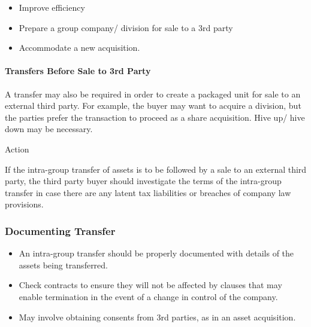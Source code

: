 \documentclass[
]{article}
\providecommand{\tightlist}{%
  \setlength{\itemsep}{0pt}\setlength{\parskip}{0pt}}
\newenvironment{env-0fd99421-2bbe-4c93-bdcb-b11371f3d791}
{
    \savenotes\tcolorbox[blanker,breakable,left=5pt,borderline west={2pt}{-4pt}{aquamarine}]
}
{
    \endtcolorbox\spewnotes
}
\begin{document}
\begin{itemize}
\tightlist
\item
  Improve efficiency
\item
  Prepare a group company/ division for sale to a 3rd party
\item
  Accommodate a new acquisition.
\end{itemize}

\hypertarget{transfers-before-sale-to-3rd-party}{%
\paragraph{Transfers Before Sale to 3rd
Party}\label{transfers-before-sale-to-3rd-party}}

A transfer may also be required in order to create a packaged unit for
sale to an external third party. For example, the buyer may want to
acquire a division, but the parties prefer the transaction to proceed as
a share acquisition. Hive up/ hive down may be necessary.

\begin{env-0fd99421-2bbe-4c93-bdcb-b11371f3d791}

Action

If the intra-group transfer of assets is to be followed by a sale to an
external third party, the third party buyer should investigate the terms
of the intra-group transfer in case there are any latent tax liabilities
or breaches of company law provisions.

\end{env-0fd99421-2bbe-4c93-bdcb-b11371f3d791}

\hypertarget{documenting-transfer}{%
\subsubsection{Documenting Transfer}\label{documenting-transfer}}

\begin{itemize}
\tightlist
\item
  An intra-group transfer should be properly documented with details of
  the assets being transferred.
\item
  Check contracts to ensure they will not be affected by clauses that
  may enable termination in the event of a change in control of the
  company.
\item
  May involve obtaining consents from 3rd parties, as in an asset
  acquisition.
\end{itemize}
\end{document}
